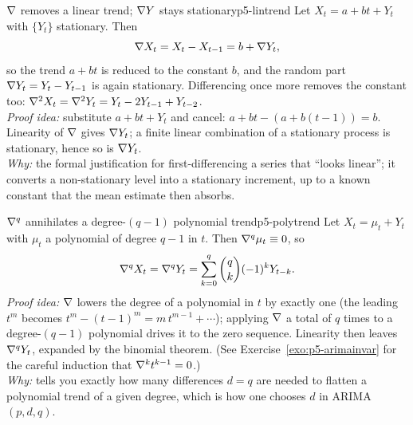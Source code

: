 \begin{proposition}{$\nabla$ removes a linear trend; $\nabla Y$ stays stationary}{p5-lintrend}
Let $X_t=a+bt+Y_t$ with $\{Y_t\}$ stationary. Then
\[
\nabla X_t=X_t-X_{t-1}=b+\nabla Y_t ,
\]
so the trend $a+bt$ is reduced to the constant $b$, and the random part
$\nabla Y_t=Y_t-Y_{t-1}$ is again stationary. Differencing once more removes the
constant too: $\nabla^{2}X_t=\nabla^{2}Y_t=Y_t-2Y_{t-1}+Y_{t-2}$.\\[2pt]
\textit{Proof idea:} substitute $a+bt+Y_t$ and cancel:
$a+bt-(a+b(t-1))=b$. Linearity of $\nabla$ gives $\nabla Y_t$; a finite linear
combination of a stationary process is stationary, hence so is $\nabla Y_t$.\\
\textit{Why:} the formal justification for first-differencing a series that
``looks linear''; it converts a non-stationary level into a stationary
increment, up to a known constant that the mean estimate then absorbs.
\end{proposition}

\begin{proposition}{$\nabla^{q}$ annihilates a degree-$(q-1)$ polynomial trend}{p5-polytrend}
Let $X_t=\mu_t+Y_t$ with $\mu_t$ a polynomial of degree $q-1$ in $t$. Then
$\nabla^{q}\mu_t\equiv 0$, so
\[
\nabla^{q}X_t=\nabla^{q}Y_t=\sum_{k=0}^{q}\binom{q}{k}(-1)^{k}Y_{t-k}.
\]
\textit{Proof idea:} $\nabla$ lowers the degree of a polynomial in $t$ by exactly
one (the leading $t^{m}$ becomes $t^{m}-(t-1)^{m}=m\,t^{m-1}+\cdots$); applying
$\nabla$ a total of $q$ times to a degree-$(q-1)$ polynomial drives it to the
zero sequence. Linearity then leaves $\nabla^{q}Y_t$, expanded by the binomial
theorem. (See Exercise~\ref{exo:p5-arimainvar} for the careful induction that
$\nabla^{k}t^{k-1}=0$.)\\
\textit{Why:} tells you exactly how many differences $d=q$ are needed to flatten
a polynomial trend of a given degree, which is how one chooses $d$ in
ARIMA$(p,d,q)$.
\end{proposition}

